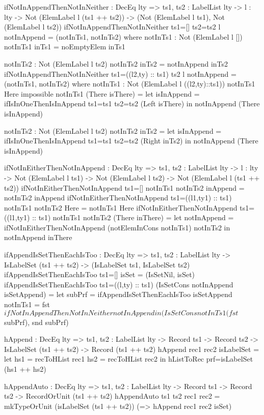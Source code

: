 \begin{code}
ifNotInAppendThenNotInNeither : DecEq lty => 
  {ts1, ts2 : LabelList lty} -> {l : lty} ->
  Not (ElemLabel l (ts1 ++ ts2)) -> 
  (Not (ElemLabel l ts1), Not (ElemLabel l ts2))
ifNotInAppendThenNotInNeither {ts1=[]} {ts2=ts2} {l} notInAppend = 
  (notInTs1, notInTs2)
  where
    notInTs1 : Not (ElemLabel l [])
    notInTs1 inTs1 = noEmptyElem inTs1
    
    notInTs2 : Not (ElemLabel l ts2)
    notInTs2 inTs2 = notInAppend inTs2
ifNotInAppendThenNotInNeither {ts1=((l2,ty) :: ts1)} {ts2} {l} 
  notInAppend = (notInTs1, notInTs2)
  where    
    notInTs1 : Not (ElemLabel l ((l2,ty)::ts1))
    notInTs1 Here impossible
    notInTs1 (There isThere) = 
      let isInAppend = ifIsInOneThenIsInAppend {ts1=ts1} 
            {ts2=ts2} (Left isThere)
      in notInAppend (There isInAppend)
    
    notInTs2 : Not (ElemLabel l ts2)
    notInTs2 inTs2 =
      let isInAppend = ifIsInOneThenIsInAppend {ts1=ts1} 
            {ts2=ts2} (Right inTs2)
      in notInAppend (There isInAppend)

ifNotInEitherThenNotInAppend : DecEq lty => 
  {ts1, ts2 : LabelList lty} -> {l : lty} ->
  Not (ElemLabel l ts1) -> Not (ElemLabel l ts2) -> 
  Not (ElemLabel l (ts1 ++ ts2))
ifNotInEitherThenNotInAppend {ts1=[]} notInTs1 notInTs2 inAppend = 
  notInTs2 inAppend
ifNotInEitherThenNotInAppend {ts1=((l1,ty1) :: ts1)} notInTs1 
  notInTs2 Here = notInTs1 Here
ifNotInEitherThenNotInAppend {ts1=((l1,ty1) :: ts1)} notInTs1 
  notInTs2 (There inThere) = 
  let notInAppend = ifNotInEitherThenNotInAppend 
        (notElemInCons notInTs1) notInTs2
  in notInAppend inThere

ifAppendIsSetThenEachIsToo : DecEq lty => 
  {ts1, ts2 : LabelList lty} -> IsLabelSet (ts1 ++ ts2) -> 
  (IsLabelSet ts1, IsLabelSet ts2)
ifAppendIsSetThenEachIsToo {ts1=[]} isSet = (IsSetNil, isSet)
ifAppendIsSetThenEachIsToo {ts1=((l,ty) :: ts1)} 
  (IsSetCons notInAppend isSetAppend) =
  let 
    subPrf = ifAppendIsSetThenEachIsToo isSetAppend
    notInTs1 = fst $ ifNotInAppendThenNotInNeither notInAppend
  in (IsSetCons notInTs1 (fst $ subPrf), snd subPrf)

hAppend : DecEq lty => {ts1, ts2 : LabelList lty} -> Record ts1 -> 
  Record ts2 -> IsLabelSet (ts1 ++ ts2) -> Record (ts1 ++ ts2)
hAppend rec1 rec2 isLabelSet =
  let
    hs1 = recToHList rec1
    hs2 = recToHList rec2
  in hListToRec {prf=isLabelSet} (hs1 ++ hs2)
    
hAppendAuto : DecEq lty => {ts1, ts2 : LabelList lty} -> 
  Record ts1 -> Record ts2 -> RecordOrUnit (ts1 ++ ts2)
hAppendAuto {ts1} {ts2} rec1 rec2 = 
  mkTypeOrUnit (isLabelSet (ts1 ++ ts2)) 
    (\isSet => hAppend rec1 rec2 isSet)


\end{code}
